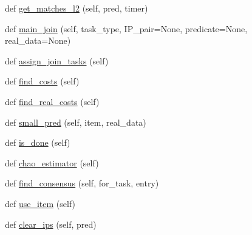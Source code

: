 \begin{DoxyCompactItemize}
\item 
def \hyperlink{classdynamicfilterapp_1_1models_1_1_join_a4d04d8503735b1728a4ed82a9d9fd070}{get\+\_\+matches\+\_\+l2} (self, pred, timer)
\item 
def \hyperlink{classdynamicfilterapp_1_1models_1_1_join_a62960f85abfb27dc5e3623c4790c6e70}{main\+\_\+join} (self, task\+\_\+type, I\+P\+\_\+pair=None, predicate=None, real\+\_\+data=None)
\item 
def \hyperlink{classdynamicfilterapp_1_1models_1_1_join_ad567a4773f2c57ad19df7e88ba5dc774}{assign\+\_\+join\+\_\+tasks} (self)
\item 
def \hyperlink{classdynamicfilterapp_1_1models_1_1_join_ac9cef0d40608117205ed9d5118f5f87c}{find\+\_\+costs} (self)
\item 
def \hyperlink{classdynamicfilterapp_1_1models_1_1_join_adb5d30a19bc96815ec8f79b9ddefb1cf}{find\+\_\+real\+\_\+costs} (self)
\item 
def \hyperlink{classdynamicfilterapp_1_1models_1_1_join_a7f921ca8a9fa8f58520cc49ac743dcac}{small\+\_\+pred} (self, item, real\+\_\+data)
\item 
def \hyperlink{classdynamicfilterapp_1_1models_1_1_join_ae557f7da2ff1786d7268f7226e89d42b}{is\+\_\+done} (self)
\item 
def \hyperlink{classdynamicfilterapp_1_1models_1_1_join_a582efaf16c8455e890ef61101a863966}{chao\+\_\+estimator} (self)
\item 
def \hyperlink{classdynamicfilterapp_1_1models_1_1_join_a767745d0dad333b32a77be416c2bb117}{find\+\_\+consensus} (self, for\+\_\+task, entry)
\item 
def \hyperlink{classdynamicfilterapp_1_1models_1_1_join_a53b3d6276057a6991b0e03cacb4818a9}{use\+\_\+item} (self)
\item 
def \hyperlink{classdynamicfilterapp_1_1models_1_1_join_aaf3c24b85bb49707bf5b8ab6da21068c}{clear\+\_\+ips} (self, pred)
\end{DoxyCompactItemize}
